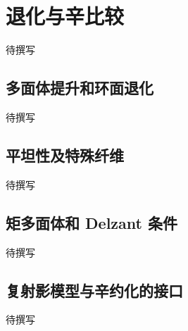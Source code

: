 
% 
% 
% 

\section{退化与辛比较}
\label{g5:sec:2805}

待撰写

\subsection{多面体提升和环面退化}
\label{g5:subsec:2805:01}
待撰写

\subsection{平坦性及特殊纤维}
\label{g5:subsec:2805:02}
待撰写

\subsection{矩多面体和 Delzant 条件}
\label{g5:subsec:2805:03}
待撰写

\subsection{复射影模型与辛约化的接口}
\label{g5:subsec:2805:04}
待撰写
